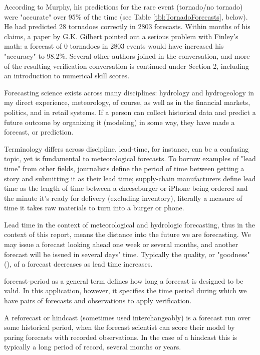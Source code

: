\documentclass[logos,parttoc,morelanguage=french,morelanguage=german,draft]{orsay-memoire}
\begin{document}
According to Murphy, his predictions for the rare event (tornado/no tornado) were "accurate" over 95\% of the time (see Table \ref{tbl:TornadoForecasts}, below). He had predicted 28 tornadoes correctly in 2803 forecasts. Within months of his claims, a paper by G.K. Gilbert pointed out a serious problem with Finley's math: a forecast of 0 tornadoes in 2803 events would have increased his "accuracy" to 98.2\%. Several other authors joined in the conversation, and more of the resulting verification conversation is continued under Section 2, including an introduction to numerical skill scores.

Forecasting science exists across many disciplines: hydrology and hydrogeology in my direct experience, meteorology, of course, as well as in the financial markets, politics, and in retail systems. If a person can collect historical data and predict a future outcome by organizing it (modeling) in some way, they have made a forecast, or prediction.

Terminology differs across discipline. \gls{lead-time}, for instance, can be a confusing topic, yet is fundamental to meteorological forecasts. To borrow examples of "lead time" from other fields, journalists define the period of time between getting a story and submitting it as their lead time; supply-chain manufacturers define lead time as the length of time between a cheeseburger or iPhone being ordered and the minute it's ready for delivery (excluding inventory), literally a measure of time it takes raw materials to turn into a burger or phone.

Lead time in the context of meteorological and hydrologic forecasting, thus in the context of this report, means the distance into the future we are forecasting. We may issue a forecast looking ahead one week or several months, and another forecast will be issued in several days' time. Typically the quality, or "goodness" (\autocite{murphy1993good}), of a forecast decreases as lead time increases.

\gls{forecast-period} as a general term defines how long a forecast is designed to be valid. In this application, however, it specifies the time period during which we have pairs of forecasts and observations to apply verification.

A reforecast or \gls{hindcast} (sometimes used interchangeably) is a forecast run over some historical period, when the forecast scientist can score their model by paring forecasts with recorded observations. In the case of a hindcast this is typically a long period of record, several months or years.
\end{document}
